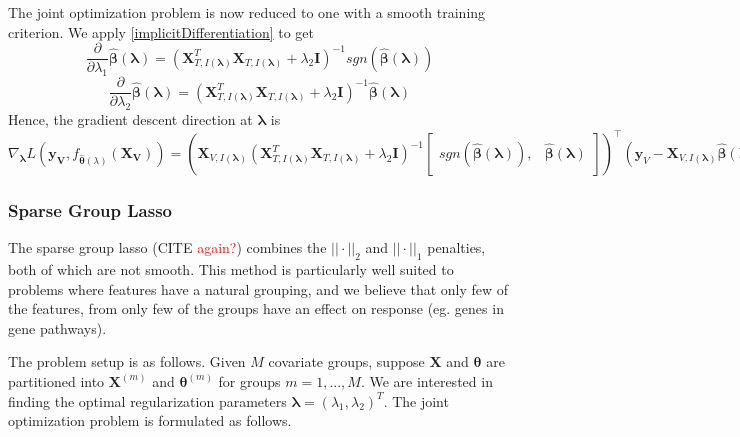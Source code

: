 \documentclass[10pt,letterpaper]{article}
\begin{document}
The joint optimization problem is now reduced to one with a smooth training criterion. We apply \eqref{implicitDifferentiation} to get
\begin{equation}
\frac{\partial}{\partial \lambda_1} \hat{\boldsymbol{\beta}}(\boldsymbol{\lambda}) =
(\boldsymbol{X}_{T, I(\boldsymbol\lambda)}^T \boldsymbol{X}_{T, I(\boldsymbol\lambda)} + \lambda_2 \boldsymbol{I})^{-1}
sgn \left (\hat{\boldsymbol{\beta}} (\boldsymbol{\lambda}) \right )
\end{equation}
\begin{equation}
\frac{\partial}{\partial \lambda_2} \hat{\boldsymbol{\beta}}(\boldsymbol{\lambda}) = (\boldsymbol{X}_{T, I(\boldsymbol\lambda)}^T\boldsymbol{X}_{T, I(\boldsymbol\lambda)} + \lambda_2 \boldsymbol{I})^{-1}\hat{\boldsymbol{\beta}} (\boldsymbol{\lambda})
\end{equation}
Hence, the gradient descent direction at $\boldsymbol{\lambda}$ is
\begin{equation}
\nabla_{\boldsymbol \lambda} L(\boldsymbol{y_V}, f_{\hat{\boldsymbol{\theta}}(\lambda)}(\boldsymbol{X_V})) =
\left (
\boldsymbol{X}_{V, I(\boldsymbol\lambda)}
\left (
\boldsymbol{X}_{T, I(\boldsymbol\lambda)}^T \boldsymbol{X}_{T, I(\boldsymbol\lambda)} + \lambda_2 \boldsymbol{I}
\right )^{-1}
\begin{bmatrix}
sgn(\hat{\boldsymbol{\beta}} (\boldsymbol{\lambda})), & \hat{\boldsymbol{\beta}} (\boldsymbol{\lambda})
\end{bmatrix}
\right )^{\top}
\left (
\boldsymbol y_V - \boldsymbol{X}_{V, I(\boldsymbol\lambda)} \hat{\boldsymbol{\beta}} (\boldsymbol{\lambda})
\right )
\end{equation}

\subsubsection{Sparse Group Lasso}

The sparse group lasso (CITE \textcolor{red}{again?}) combines the $||\cdot||_2$ and $||\cdot||_1$ penalties, both of which are not smooth. This method is particularly well suited to problems where features have a natural grouping, and we believe that only few of the features, from only few of the groups have an effect on response (eg. genes in gene pathways). 

The problem setup is as follows. Given $M$ covariate groups, suppose $\boldsymbol{X}$ and $\boldsymbol \theta$ are partitioned into $\boldsymbol{X}^{(m)}$ and $\boldsymbol \theta^{(m)}$ for groups $m = 1, ... , M$. We are interested in finding the optimal regularization parameters $\boldsymbol{\lambda} = (\lambda_1, \lambda_2)^T$. The joint optimization problem is formulated as follows.
\end{document}
